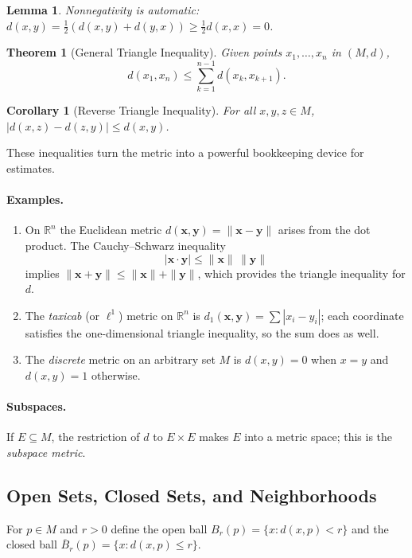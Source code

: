 \documentclass{article}
\theoremstyle{definition}
\theoremstyle{plain}
\newtheorem{theorem}{Theorem}[section]
\newtheorem{lemma}{Lemma}[section]
\newtheorem{corollary}{Corollary}[theorem]
\begin{document}
\begin{lemma}\label{lem:metric-nonneg}
Nonnegativity is automatic: $d(x,y) = \tfrac12(d(x,y)+d(y,x)) \ge \tfrac12 d(x,x)=0$.
\end{lemma}

\begin{theorem}[General Triangle Inequality]\label{thm:general-triangle}
Given points $x_1,\dots,x_n$ in $(M,d)$,
\[
	d(x_1,x_n) \le \sum_{k=1}^{n-1} d(x_k,x_{k+1}).
\]
\end{theorem}

\begin{corollary}[Reverse Triangle Inequality]\label{cor:reverse-triangle}
For all $x,y,z\in M$, $|d(x,z)-d(z,y)|\le d(x,y)$.
\end{corollary}

These inequalities turn the metric into a powerful bookkeeping device for estimates.

\paragraph{Examples.}
\begin{enumerate}
	\item On $\mathbb{R}^n$ the Euclidean metric $d(\mathbf{x},\mathbf{y})=\|\mathbf{x}-\mathbf{y}\|$ arises from the dot product. The Cauchy--Schwarz inequality
	\[
		|\mathbf{x}\cdot\mathbf{y}| \le \|\mathbf{x}\|\,\|\mathbf{y}\|
	\]
	implies $\|\mathbf{x}+\mathbf{y}\| \le \|\mathbf{x}\|+\|\mathbf{y}\|$, which provides the triangle inequality for $d$.
	\item The \emph{taxicab} (or $\ell^1$) metric on $\mathbb{R}^n$ is $d_1(\mathbf{x},\mathbf{y})=\sum |x_i-y_i|$; each coordinate satisfies the one-dimensional triangle inequality, so the sum does as well.
	\item The \emph{discrete} metric on an arbitrary set $M$ is $d(x,y)=0$ when $x=y$ and $d(x,y)=1$ otherwise.
\end{enumerate}

\paragraph{Subspaces.} If $E\subseteq M$, the restriction of $d$ to $E\times E$ makes $E$ into a metric space; this is the \emph{subspace metric}.

	\subsection{Open Sets, Closed Sets, and Neighborhoods}\label{subsec:open-closed}
For $p\in M$ and $r>0$ define the open ball $B_r(p)=\{x : d(x,p)<r\}$ and the closed ball $\overline{B}_r(p)=\{x : d(x,p)\le r\}$.
\end{document}
